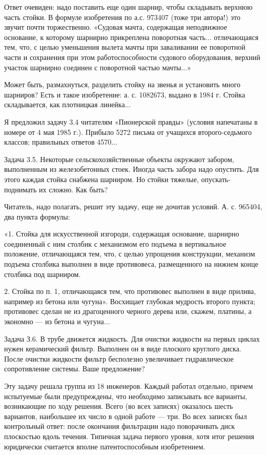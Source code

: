 Ответ  очевиден:  надо поставить  еще  один  шарнир, чтобы  складывать
верхнюю  часть стойки.  В  формуле изобретения  по  а.с. 973407  (тоже
три   автора!)  это   звучит  почти   торжественно.  «Судовая   мачта,
содержащая  неподвижное  основание,  к которому  шарнирно  прикреплена
поворотная часть...  отличающаяся тем, что, с  целью уменьшения вылета
мачты  при  заваливании ее  поворотной  части  и сохранения  при  этом
работоспособности  судового  оборудования,  верхний  участок  шарнирно
соединен с поворотной частью мачты...»

Может  быть, размахнуться,  разделить  стойку на  звенья и  установить
много шарниров? Есть и такое изобретение: а. с. 1082673, выдано в 1984
г. Стойка складывается, как плотницкая линейка...

Я  предложил   задачу  3.4  читателям  «Пионерской   правды»  (условия
напечатаны в номере от 4 мая 1985 г.). Прибыло 5272 письма от учащихся
второго-седьмого классов; правильных ответов 4570...


Задача 3.5.  Некоторые сельскохозяйственные объекты  окружают забором,
выполненным  из   железобетонных  стоек.  Иногда  часть   забора  надо
опустить.  Для  этого  каждая  стойка  снабжена  шарниром.  Но  стойки
тяжелые, опускать-поднимать их сложно. Как быть?

Читатель, надо полагать, решит эту  задачу, еще не дочитав условий. А.
с. 965404, два пункта формулы:

«1. Стойка для искусственной  изгороди, содержащая основание, шарнирно
соединенный  с ним  столбик с  механизмом его  подъема в  вертикальное
положение,  отличающаяся  тем,  что, с  целью  упрощения  конструкции,
механизм подъема столбика выполнен в виде противовеса, размещенного на
нижнем конце столбика под шарниром.

2. Стойка  по п. 1, отличающаяся  тем, что противовес выполнен  в виде
прилива, например  из бетона или чугуна».  Восхищает глубокая мудрость
второго пункта;  противовес сделан  не из драгоценного  черного дерева
или, скажем, платины, а экономно — из бетона и чугуна...

Задача  З.6.  В  трубе  движется жидкость.  Для  очистки  жидкости  на
первых циклах нужен  керамический фильтр. Выполнен он  в виде плоского
круглого диска.  После очистки жидкости фильтр  бесполезно увеличивает
гидравлическое сопротивление системы. Ваше предложение?

Эту задачу  решала группа  из 18  инженеров. Каждый  работал отдельно,
причем испытуемые  были предупреждены,  что необходимо  записывать все
варианты,  возникающие  по  ходу  решения.  Всего  (во  всех  записях)
оказалось шесть вариантов,  наибольшее их число в одной  работе — три.
Во всех записях был контрольный ответ: после окончания фильтрации надо
поворачивать диск  плоскостью вдоль  течения. Типичная  задача первого
уровня, хотя итог решения юридически считается вполне патентоспособным
изобретением.


